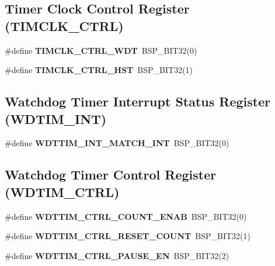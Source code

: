 \subsection*{Timer Clock Control Register (T\+I\+M\+C\+L\+K\+\_\+\+C\+T\+RL)}
\begin{DoxyCompactItemize}
\item 
\mbox{\label{group__lpc32xx__reg_ga905adf32fb2fa8f12efd1074afbf4299}} 
\#define {\bfseries T\+I\+M\+C\+L\+K\+\_\+\+C\+T\+R\+L\+\_\+\+W\+DT}~B\+S\+P\+\_\+\+B\+I\+T32(0)
\item 
\mbox{\label{group__lpc32xx__reg_ga1a804bb662ea8ee3efc3290ed8a906d8}} 
\#define {\bfseries T\+I\+M\+C\+L\+K\+\_\+\+C\+T\+R\+L\+\_\+\+H\+ST}~B\+S\+P\+\_\+\+B\+I\+T32(1)
\end{DoxyCompactItemize}
\subsection*{Watchdog Timer Interrupt Status Register (W\+D\+T\+I\+M\+\_\+\+I\+NT)}
\begin{DoxyCompactItemize}
\item 
\mbox{\label{group__lpc32xx__reg_gab73fcc6c0d63567d8819ff9916d33f67}} 
\#define {\bfseries W\+D\+T\+T\+I\+M\+\_\+\+I\+N\+T\+\_\+\+M\+A\+T\+C\+H\+\_\+\+I\+NT}~B\+S\+P\+\_\+\+B\+I\+T32(0)
\end{DoxyCompactItemize}
\subsection*{Watchdog Timer Control Register (W\+D\+T\+I\+M\+\_\+\+C\+T\+RL)}
\begin{DoxyCompactItemize}
\item 
\mbox{\label{group__lpc32xx__reg_gacebca28071ce307fb5d3e46ffba1f512}} 
\#define {\bfseries W\+D\+T\+T\+I\+M\+\_\+\+C\+T\+R\+L\+\_\+\+C\+O\+U\+N\+T\+\_\+\+E\+N\+AB}~B\+S\+P\+\_\+\+B\+I\+T32(0)
\item 
\mbox{\label{group__lpc32xx__reg_ga15139299d25ee03f5abd1c48530ada1e}} 
\#define {\bfseries W\+D\+T\+T\+I\+M\+\_\+\+C\+T\+R\+L\+\_\+\+R\+E\+S\+E\+T\+\_\+\+C\+O\+U\+NT}~B\+S\+P\+\_\+\+B\+I\+T32(1)
\item 
\mbox{\label{group__lpc32xx__reg_ga76a0f31d08658a9ea5f3e6affc6ee8e2}} 
\#define {\bfseries W\+D\+T\+T\+I\+M\+\_\+\+C\+T\+R\+L\+\_\+\+P\+A\+U\+S\+E\+\_\+\+EN}~B\+S\+P\+\_\+\+B\+I\+T32(2)
\end{DoxyCompactItemize}
